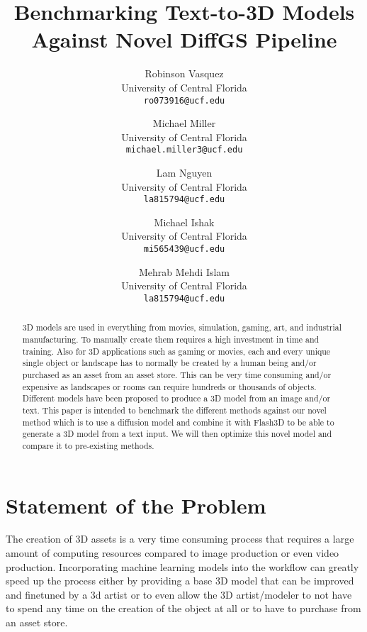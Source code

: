 \documentclass[10pt,twocolumn,letterpaper]{article}
\begin{document}
\raggedbottom  %

\title{Benchmarking Text-to-3D Models Against Novel DiffGS Pipeline}

\author{
Robinson Vasquez\\
University of Central Florida\\
{\tt\small ro073916@ucf.edu}
\and
Michael Miller\\
University of Central Florida\\
{\tt\small michael.miller3@ucf.edu}
\and
Lam Nguyen\\
University of Central Florida\\
{\tt\small la815794@ucf.edu}
\and
Michael Ishak\\
University of Central Florida\\
{\tt\small mi565439@ucf.edu}
\and
Mehrab Mehdi Islam\\
University of Central Florida\\
{\tt\small la815794@ucf.edu}
}
\maketitle

\begin{abstract}

3D models are used in everything from movies, simulation, gaming, art, and industrial manufacturing. To manually create them requires a high investment in time and training. Also for 3D applications such as gaming or movies, each and every unique single object or landscape has to normally be created by a human being and/or purchased as an asset from an asset store. This can be very time consuming and/or expensive as landscapes or rooms can require hundreds or thousands of objects. Different models have been proposed to produce a 3D model from an image and/or text. This paper is intended to benchmark the different methods against our novel method  which is to use a diffusion model and combine it with Flash3D to be able to generate a 3D model from a text input.  We will then optimize this novel model and compare it to pre-existing methods.

\end{abstract}

\section{Statement of the Problem}

The creation of 3D assets is a very time consuming process that requires a large amount of computing resources compared to image production or even video production. Incorporating machine learning models into the workflow can greatly speed up the process either by providing a base 3D model that can be improved and finetuned by a 3d artist or to even allow the 3D artist/modeler to not have to spend any time on the creation of the object at all or to have to purchase from an asset store.
\end{document}
